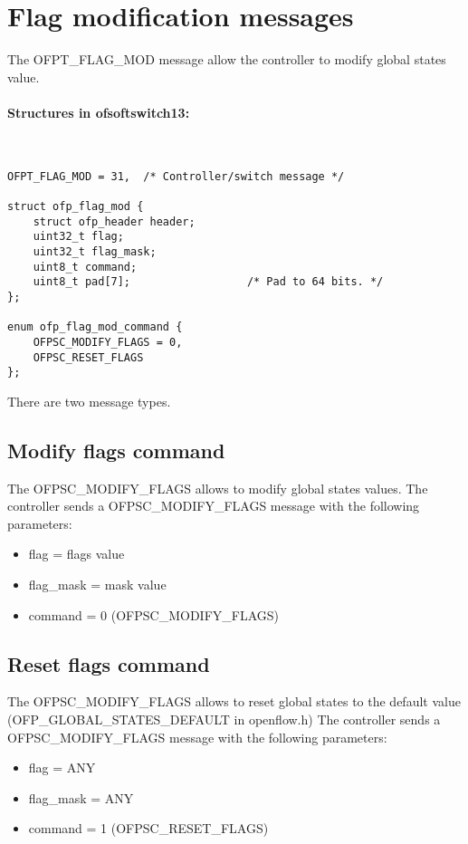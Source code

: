 \section{Flag modification messages}
\label{section:flag_mod_msg}
The OFPT\_FLAG\_MOD message allow the controller to modify global states value.
\paragraph{Structures in ofsoftswitch13:}\mbox{}\\
\begin{verbatim}
OFPT_FLAG_MOD = 31,  /* Controller/switch message */

struct ofp_flag_mod {
    struct ofp_header header;
    uint32_t flag;
    uint32_t flag_mask;
    uint8_t command;
    uint8_t pad[7];                  /* Pad to 64 bits. */
};

enum ofp_flag_mod_command { 
    OFPSC_MODIFY_FLAGS = 0,
    OFPSC_RESET_FLAGS
};

\end{verbatim}

There are two message types.
\subsection{Modify flags command}
The OFPSC\_MODIFY\_FLAGS allows to modify global states values. The controller sends a OFPSC\_MODIFY\_FLAGS message with the following parameters:
\begin{itemize}
\setlength\itemsep{0em}
\item flag = flags value
\item flag\_mask = mask value
\item command = 0 (OFPSC\_MODIFY\_FLAGS)
\end{itemize}

\subsection{Reset flags command}
The OFPSC\_MODIFY\_FLAGS allows to reset global states to the default value (OFP\_GLOBAL\_STATES\_DEFAULT in openflow.h)
The controller sends a OFPSC\_MODIFY\_FLAGS message with the following parameters:
\begin{itemize}
\setlength\itemsep{0em}
\item flag = ANY
\item flag\_mask = ANY
\item command = 1 (OFPSC\_RESET\_FLAGS)
\end{itemize}

